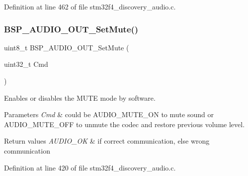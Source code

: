 Definition at line 462 of file stm32f4\+\_\+discovery\+\_\+audio.\+c.

\mbox{\label{group___s_t_m32_f4___d_i_s_c_o_v_e_r_y___a_u_d_i_o___o_u_t___exported___functions_ga6f0fdfb8396ba31eaebb8ff530de3dd3}} 
\subsubsection{\texorpdfstring{B\+S\+P\+\_\+\+A\+U\+D\+I\+O\+\_\+\+O\+U\+T\+\_\+\+Set\+Mute()}{BSP\_AUDIO\_OUT\_SetMute()}}
{\footnotesize\ttfamily uint8\+\_\+t B\+S\+P\+\_\+\+A\+U\+D\+I\+O\+\_\+\+O\+U\+T\+\_\+\+Set\+Mute (\begin{DoxyParamCaption}\item[{uint32\+\_\+t}]{Cmd }\end{DoxyParamCaption})}



Enables or disables the M\+U\+TE mode by software. 


\begin{DoxyParams}{Parameters}
{\em Cmd} & could be A\+U\+D\+I\+O\+\_\+\+M\+U\+T\+E\+\_\+\+ON to mute sound or A\+U\+D\+I\+O\+\_\+\+M\+U\+T\+E\+\_\+\+O\+FF to unmute the codec and restore previous volume level. \\
\hline
\end{DoxyParams}

\begin{DoxyRetVals}{Return values}
{\em A\+U\+D\+I\+O\+\_\+\+OK} & if correct communication, else wrong communication \\
\hline
\end{DoxyRetVals}


Definition at line 420 of file stm32f4\+\_\+discovery\+\_\+audio.\+c.

